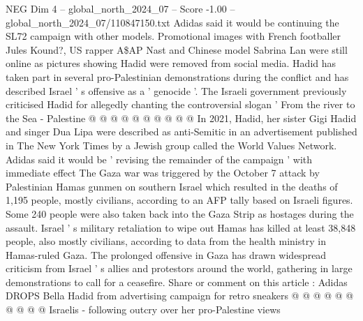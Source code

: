 \begin{textsample}{NEG Dim 4 – global\_north\_2024\_07 – Score -1.00 – global\_north\_2024\_07/110847150.txt}
Adidas said it would be continuing the SL72 campaign with other models.
Promotional images with French footballer Jules Kound?, US rapper A\$AP Nast and Chinese model Sabrina Lan were still online as pictures showing Hadid were removed from social media.
Hadid has taken part in several pro-Palestinian demonstrations during the conflict and has described Israel ' s offensive as a ' genocide '.
The Israeli government previously criticised Hadid for allegedly chanting the controversial slogan ' From the river to the Sea - Palestine @ @ @ @ @ @ @ @ @ @ In 2021, Hadid, her sister Gigi Hadid and singer Dua Lipa were described as anti-Semitic in an advertisement published in The New York Times by a Jewish group called the World Values Network.
Adidas said it would be ' revising the remainder of the campaign ' with immediate effect The Gaza war was triggered by the October 7 attack by Palestinian Hamas gunmen on southern Israel which resulted in the deaths of 1,195 people, mostly civilians, according to an AFP tally based on Israeli figures.
Some 240 people were also taken back into the Gaza Strip as hostages during the assault.
Israel ' s military retaliation to wipe out Hamas has killed at least 38,848 people, also mostly civilians, according to data from the health ministry in Hamas-ruled Gaza.
The prolonged offensive in Gaza has drawn widespread criticism from Israel ' s allies and protestors around the world, gathering in large demonstrations to call for a ceasefire.
Share or comment on this article : Adidas DROPS Bella Hadid from advertising campaign for retro sneakers @ @ @ @ @ @ @ @ @ @ Israelis - following outcry over her pro-Palestine views

\end{textsample}
